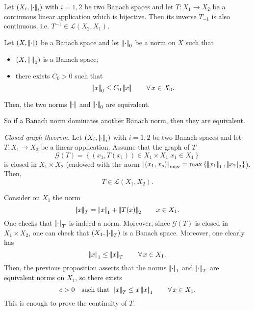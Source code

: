 \documentclass{article}
\begin{document}
\begin{corollary}
	Let $\left(X_{i},\dnorm_{i}\right)$ with $i=1,2$ be two Banach spaces and let $T:X_{1}\to X_{2}$ be a continuous linear application which is bijective. Then its inverse $T_{-1}$ is also continuous, i.e. $T^{-1}\in\mathscr{L}(X_{2},X_{1})$.
\end{corollary}
\begin{proposition}
	Let $\normsp{X}$ be a Banach space and let $\dnorm_{0}$ be a norm on $X$ such that
	\begin{itemize}
		\item $\left(X,\dnorm_{0}\right)$ is a Banach space;
		\item there exists $C_{0}>0$ such that
		\begin{equation*}
			\norm{x}_{0}\leq C_{0}\norm{x}\qquad\every x\in X_{0}.
		\end{equation*}
	\end{itemize}
	Then, the two norms $\dnorm$ and $\dnorm_{0}$ are equivalent.
	\end{proposition}
So if a Banach norm dominates another Banach norm, then they are equivalent.
\begin{theorem}
	\emph{Closed graph theorem}. Let $\left(X_{i},\dnorm_{i}\right)$ with $i=1,2$ be two Banach spaces and let $T:X_{1}\to X_{2}$ be a linear application. Assume that the graph of $T$
	\begin{equation*}
		\mathcal{G}(T)=\left\{(x_{1},T(x_{1}))\in X_{1}\times X_{1}\; x_{1}\in X_{1}\right\}
	\end{equation*}
	is closed in $X_{1}\times X_{2}$ (endowed with the norm $\norm{(x_{1},x_{s})}_{\max}=\max\left\{\norm{x_{1}}_{1},\norm{x_{2}}_{2}\right\}$). Then, 
	\begin{equation*}
		T\in\mathscr{L}(X_{1},X_{2}).
	\end{equation*}
\end{theorem}
\begin{fancyproof}
	Consider on $X_{1}$ the norm
	\begin{equation*}
		\norm{x}_{T}=\norm{x}_{1}+\norm{T(x)}_{2}\qquad x\in X_{1}.
	\end{equation*}
	One checks that $\dnorm_{T}$ is indeed a norm. Moreover, since $\mathcal{G}(T)$ is closed in $X_{1}\times X_{2}$, one can check that $(X_{1},\dnorm_{T})$ is a Banach space. Moreover, one clearly has 
	\begin{equation*}
		\norm{x}_{1}\leq\norm{x}_{T}\qquad\every x\in X_{1}.
	\end{equation*}
	Then, the previous proposition asserts that the norms $\dnorm_{1}$ and $\dnorm_{T}$ are equivalent norms on $X_{1}$, so there exists
	\begin{equation*}
		c>0\quad\text{such that }\norm{x}_{T}\leq x\norm{x}_{1}\qquad\every x\in X_{1}.
	\end{equation*}
	This is enough to prove the continuity of $T$.
\end{fancyproof}
\end{document}

